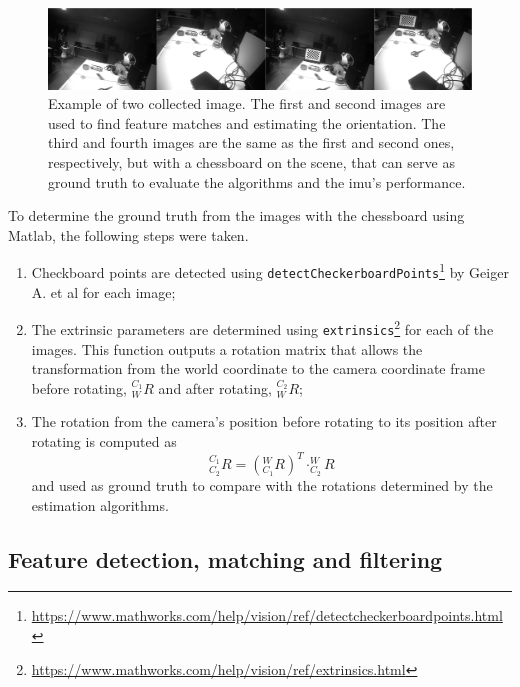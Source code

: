 \begin{figure}[ht]
	\centering
	\includegraphics[width=\textwidth]{images/imagesex.png}
	\caption[Example of of two collected image]{Example of two collected image. The first and second images are used to find feature matches and estimating the orientation. The third and fourth images are the same as the first and second ones, respectively, but with a chessboard on the scene, that can serve as ground truth to evaluate the algorithms and the \acrshort{imu}'s performance.}
	\label{cha3:methodology:imagesex}
\end{figure}

To determine the ground truth from the images with the chessboard using Matlab, the following steps were taken.

\begin{enumerate}
	\item Checkboard points are detected using \texttt{detectCheckerboardPoints}\footnote{\href{https://www.mathworks.com/help/vision/ref/detectcheckerboardpoints.html}{https://www.mathworks.com/help/vision/ref/detectcheckerboardpoints.html}} by Geiger A. et al \cite{geiger} for each image;
	\item The extrinsic parameters are determined using \texttt{extrinsics}\footnote{\href{https://www.mathworks.com/help/vision/ref/extrinsics.html}{https://www.mathworks.com/help/vision/ref/extrinsics.html}} for each of the images. This function outputs a rotation matrix that allows the transformation from the world coordinate to the camera coordinate frame before rotating, $^{C_1}_{W}R$ and after rotating, $^{C_2}_{W}R$;
	\item The rotation from the camera's position before rotating to its position after rotating is computed as
	\begin{equation}
		^{C_1}_{C_2}R = (^{W}_{C_1}R)^T  \cdot  ^{W}_{C_2}R
	\end{equation}
	and used as ground truth to compare with the rotations determined by the estimation algorithms.
\end{enumerate}

\subsection{Feature detection, matching and filtering}
\label{cha3:features}

